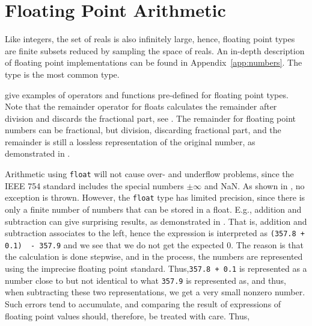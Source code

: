 \documentclass[fsharpNotes.tex]{subfiles}
\begin{document}
\section{Floating Point Arithmetic}
Like integers, the set of reals is also infinitely large, hence, floating point types are finite subsets reduced by sampling the space of reals. An in-depth description of floating point implementations can be found in Appendix~\ref{app:numbers}. The type  is the most common type. 

 give examples of operators and functions pre-defined for floating point types. Note that the remainder operator for floats calculates the remainder after division and discards the fractional part, see .
%
%
The remainder for floating point numbers can be fractional, but division, discarding fractional part, and the remainder is still a lossless representation of the original number, as demonstrated in .
% 
%

Arithmetic using \lstinline|float| will not cause over- and underflow problems, since the IEEE 754 standard includes the special numbers $\pm\infty$ and NaN. As shown in , no exception is thrown.
%
%
However, the \lstinline|float| type has limited precision, since there is only a finite number of numbers that can be stored in a float. E.g., addition and subtraction can give surprising results, as demonstrated in .
%
%
That is, addition and subtraction associates to the left, hence the expression is interpreted as \lstinline!(357.8 + 0.1)  - 357.9! and we see that we do not get the expected 0. The reason is that the calculation is done stepwise, and in the process, the numbers are represented using the imprecise floating point standard. Thus,\lstinline!357.8 + 0.1!  is represented as a number close to but not identical to what \lstinline!357.9! is represented as, and thus, when subtracting these two representations, we get a very small nonzero number. Such errors tend to accumulate, and comparing the result of expressions of floating point values should, therefore, be treated with care. Thus, 
\end{document}
